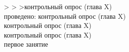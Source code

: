 \begin{multicols}{2}
\begin{tabbing}
    > > >\>\ccurr    [xx.yy] контрольный опрос (глава X) \\[1em]

    проведено:%
	\>               [xx.yy] контрольный опрос (глава X) \\
	\>               [xx.yy] контрольный опрос (глава X) \\
    \>               [xx.yy] контрольный опрос (глава X) \\
    \>               [xx.yy] первое занятие \\
\end{tabbing}
\end{multicols}

